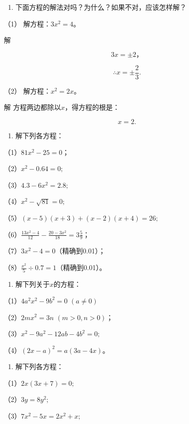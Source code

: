 \begin{enumerate}
\item
  下面方程的解法对吗？为什么？如果不对，应该怎样解？
\end{enumerate}

（1） 解方程：\(3x^{2} = 4\)。

解

\[
3 x = \pm 2\text{，}
\]

\[
\therefore x = \pm \frac{2}{3}.
\]

（2） 解方程：\(x^{2} = 2x\)。

解 方程两边都除以\(x\)，得方程的根是：

\[
x = 2.
\]

\begin{enumerate}[start=2]
\item
  解下列各方程：
\end{enumerate}

（1）\(81x^{2} - 25 = 0\)；

（2）\(x^{2} - 0.64 = 0;\)

（3）\(4.3 - 6x^{2} = 2.8;\)

（4）\(x^{2} - \sqrt{81} = 0;\)

（5）\((x - 5)(x + 3) + (x - 2)(x + 4) = 26;\)

（6）\(\frac{13x^2 - 4}{12} - \frac{20 - 3x^2}{18} = 3\frac{5}{9}\)；

（7）\(3x^{2} - 4 = 0\)（精确到0.01）；

（8）\(\frac{x^2}{5} \div 0.7 = 1\)（精确到0.01）。

\begin{enumerate}[start=9]
\item
  解下列关于\(x\)的方程：
\end{enumerate}

（1）\(4a^{2}x^{2} - 9b^{2} = 0\) \((a\neq 0)\)

（2）\(2mx^{2} = 3n\) \((m > 0, n > 0)\)；

（3）\(x^{2} - 9a^{2} - 12ab - 4b^{2} = 0;\)

（4）\((2x - a)^{2} = a(3a - 4x)\)。

\begin{enumerate}[start=4]
\item
  解下列各方程：
\end{enumerate}

（1）\(2x(3x + 7) = 0;\)

（2）\(3y = 8y^{2};\)

（3）\(7x^{2} - 5x = 2x^{2} + x;\)

